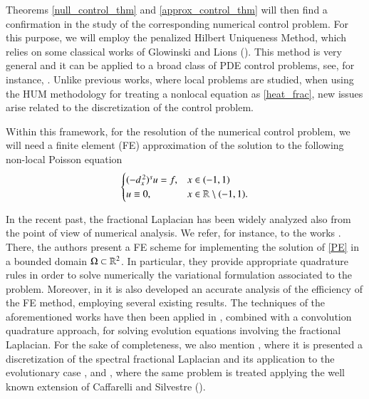 Theorems \ref{null_control_thm} and \eqref{approx_control_thm} will then find a confirmation in the study of the corresponding numerical control problem. For this purpose, we will employ the penalized Hilbert Uniqueness Method, which relies on some classical works of Glowinski and Lions (\cite{glowinski1995exact,glowinski2008exact}). This method is very general and it can be applied to a broad class of PDE control problems, see, for instance, \cite{boyer2013penalised,boyer2017insensitizing,boyer2014approximate,khodja2017partial}. Unlike previous works, where local problems are studied, when using the HUM methodology for treating a nonlocal equation as \eqref{heat_frac}, new issues arise related to the discretization of the control problem. 

Within this framework, for the resolution of the numerical control problem, we will need a finite element (FE)  approximation of the solution to the following non-local Poisson equation
\begin{align}\label{PE}
	\begin{cases}
		(-d_x^{\,2})^{s}u = f, & x\in(-1,1)
		\\
		u\equiv 0, & x\in\mathbb{R}\setminus(-1,1).
	\end{cases}
\end{align}

In the recent past, the fractional Laplacian has been widely analyzed also from the point of view of numerical analysis. We refer, for instance, to the works \cite{acosta2017short,acosta2017fractional,borthagaray2017laplaciano}. There, the authors present a FE scheme for implementing the solution of \eqref{PE} in a bounded domain $\Omega\subset\mathbb{R}^2$. In particular, they provide appropriate quadrature rules in order to solve numerically the variational formulation associated to the problem. Moreover, in \cite{acosta2017fractional,borthagaray2017laplaciano} it is also developed an accurate analysis of the efficiency of the FE method, employing several existing results. The techniques of the aforementioned works have then been applied in \cite{acosta2017finite}, combined with a convolution quadrature approach, for solving evolution equations involving the fractional Laplacian. For the sake of completeness, we also mention \cite{bonito2015numerical}, where it is presented a discretization of the spectral fractional Laplacian and its application to the evolutionary case \cite{bonito2017approximation}, and \cite{nochetto2015pde}, where the same problem is treated applying the well known extension of Caffarelli and Silvestre (\cite{caffarelli2007extension}).   

